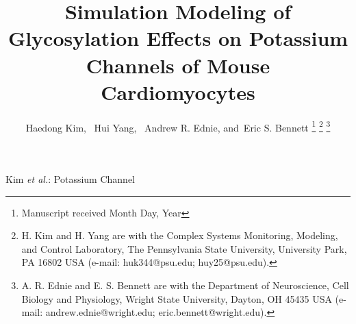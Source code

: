 \documentclass[journal]{IEEEtran}
\begin{document}
    \title{Simulation Modeling of Glycosylation Effects on Potassium Channels of Mouse Cardiomyocytes}
  \author{Haedong Kim,~
      Hui Yang,~
      Andrew R. Ednie,
      and~Eric S. Bennett
  \thanks{Manuscript received Month Day, Year}
  \thanks{H. Kim and H. Yang are with the Complex Systems Monitoring, Modeling, and Control Laboratory, The Pennsylvania State University, University Park, PA 16802 USA (e-mail: huk344@psu.edu; huy25@psu.edu).}%
  \thanks{A. R. Ednie and E. S. Bennett are with the Department of Neuroscience, Cell Biology and Physiology, Wright State University, Dayton, OH 45435 USA (e-mail: andrew.ednie@wright.edu; eric.bennett@wright.edu).}}

\markboth{}%
{Kim \MakeLowercase{\textit{et al.}}: Potassium Channel}

\maketitle
\end{document}

